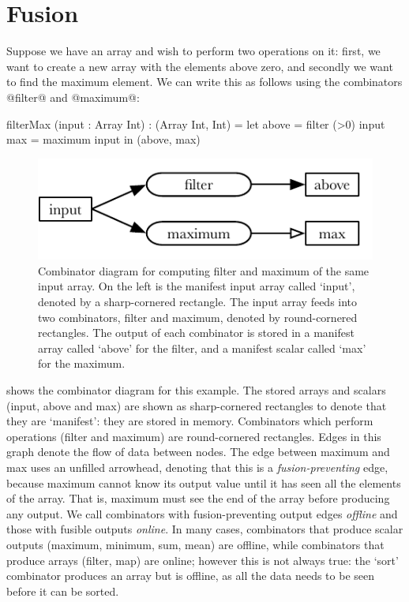 \section{Fusion}

Suppose we have an array and wish to perform two operations on it: first, we want to create a new array with the elements above zero, and secondly we want to find the maximum element.
We can write this as follows using the combinators @filter@ and @maximum@:

\begin{code}
filterMax (input : Array Int) : (Array Int, Int)
 = let above = filter (>0) input
       max   = maximum     input
   in (above, max)
\end{code}

\begin{figure}
\center
\includegraphics{figs/combinators/filtermax.pdf}
\caption[Combinator diagram for filterMax]
{Combinator diagram for computing filter and maximum of the same input array.
On the left is the manifest input array called `input', denoted by a sharp-cornered rectangle.
The input array feeds into two combinators, filter and maximum, denoted by round-cornered rectangles.
The output of each combinator is stored in a manifest array called `above' for the filter, and a manifest scalar called `max' for the maximum.}
\label{fig:combinators:filtermax}
\end{figure}


 shows the combinator diagram for this example.
The stored arrays and scalars (input, above and max) are shown as sharp-cornered rectangles to denote that they are `manifest': they are stored in memory.
Combinators which perform operations (filter and maximum) are round-cornered rectangles.
Edges in this graph denote the flow of data between nodes.
The edge between maximum and max uses an unfilled arrowhead, denoting that this is a \emph{fusion-preventing} edge, because maximum cannot know its output value until it has seen all the elements of the array.
That is, maximum must see the end of the array before producing any output.
We call combinators with fusion-preventing output edges \emph{offline} and those with fusible outputs \emph{online}.
In many cases, combinators that produce scalar outputs (maximum, minimum, sum, mean) are offline, while combinators that produce arrays (filter, map) are online; however this is not always true: the `sort' combinator produces an array but is offline, as all the data needs to be seen before it can be sorted.


